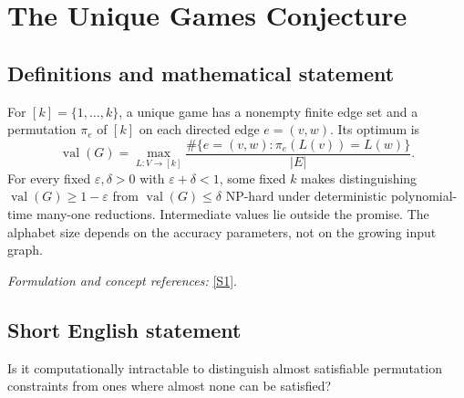 \documentclass[11pt,a4paper]{article}
\newcommand{\sref}[2]{\hyperlink{source:#1:#2}{[S#2]}}
\newif\ifshowcatalogue
\newcommand{\cataloguescope}[1]{\ifshowcatalogue
 \paragraph{Exact scope in the supplied catalogue.}
 \begin{quote}\small #1\end{quote}\fi}
\numberwithin{equation}{section}
\begin{document}
\setcounter{section}{0}
\clearpage
\section*{\texorpdfstring{The Unique Games Conjecture}{The Unique Games Conjecture}}\label{statement}
\subsection{Definitions and mathematical statement}
For $[k]=\{1,\ldots,k\}$, a unique game has a nonempty finite edge set and a permutation $\pi_e$ of $[k]$ on each directed edge $e=(v,w)$. Its optimum is
\[
 \operatorname{val}(G)=\max_{L:V\to[k]}\frac{\#\{e=(v,w):\pi_e(L(v))=L(w)\}}{|E|}.
\]
For every fixed $\varepsilon,\delta>0$ with $\varepsilon+\delta<1$, some fixed $k$ makes distinguishing $\operatorname{val}(G)\ge1-\varepsilon$ from $\operatorname{val}(G)\le\delta$ NP-hard under deterministic polynomial-time many-one reductions. Intermediate values lie outside the promise. The alphabet size depends on the accuracy parameters, not on the growing input graph.
\par\smallskip\textit{Formulation and concept references:} \sref{statement}{1}.
\cataloguescope{For every fixed pair of real constants epsilon, delta > 0 with epsilon + delta < 1, there exists an integer k >= 2, depending only on epsilon and delta, such that the following promise problem is NP-hard under deterministic polynomial-time many-one reductions. An instance is a finite directed constraint graph G=(V,E) with E nonempty and, for each edge e=(v,w), a permutation pi\_e of [k]. For a labeling L:V->[k], an edge is satisfied if pi\_e(L(v))=L(w); val(G) is the largest fraction of satisfied edges over all labelings. Distinguish val(G) >= 1-epsilon from val(G) <= delta, with no requirement on instances between these thresholds. The graph is the growing input; epsilon, delta and k are fixed constants. NP-hardness means that every language in NP has such a reduction mapping yes inputs to the first promised set and no inputs to the second.}
\subsection{Short English statement}
Is it computationally intractable to distinguish almost satisfiable permutation constraints from ones where almost none can be satisfied?
\end{document}

